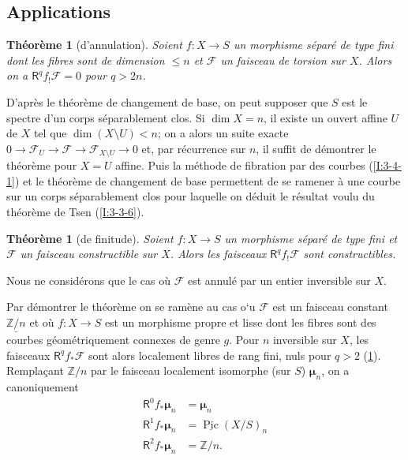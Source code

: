 \documentclass{book}
\DeclareMathOperator{\pic}{Pic}
\newcommand{\cF}{\mathcal{F}}
\newcommand{\dmu}{{\bm\mu}}%
\newcommand{\dZ}{\mathbb{Z}}
\newcommand{\const}[1]{\underline{#1}}
\newcommand{\R}{\mathsf{R}}
\newtheorem{theorem}[subsubsection]{Théorème}
\begin{document}
\subsection{Applications}\label{I:4-6}





\begin{theorem}[d'annulation]\label{I:4-6-1}
Soient $f:X\to S$ un morphisme séparé de type fini dont les fibres sont de 
dimension $\leqslant n$ et $\cF$ un faisceau de torsion sur $X$. Alors on a 
$\R^q f_! \cF = 0$ pour $q>2 n$. 
\end{theorem}

D'après le théorème de changement de base, on peut supposer que $S$ est 
le spectre d'un corps séparablement clos. Si $\dim X = n$, il existe un 
ouvert affine $U$ de $X$ tel que $\dim(X\setminus U) < n$; on a alors un suite 
exacte $0\to \cF_U \to \cF \to \cF_{X\setminus U} \to 0$ et, par récurrence sur $n$, 
il suffit de démontrer le théorème pour $X=U$ affine. Puis la méthode de 
fibration par des courbes (\ref{I:3-4-1}) et le théorème de changement de 
base permettent de se ramener à une courbe sur un corps séparablement clos 
pour laquelle on déduit le résultat voulu du théorème de Tsen 
(\ref{I:3-3-6}). 





\begin{theorem}[de finitude]\label{I:4-6-2}
Soient $f:X\to S$ un morphisme séparé de type fini et $\cF$ un faisceau 
constructible sur $X$. Alors les faisceaux $\R^q f_! \cF$ sont constructibles. 
\end{theorem}

Nous ne considérons que le cas où $\cF$ est annulé par un entier inversible 
sur $X$. 

Par démontrer le théorème on se ramène au cas o`u $\cF$ est un faisceau 
constant $\const{\dZ/n}$ et où $f:X\to S$ est un morphisme propre et lisse 
dont les fibres sont des courbes géométriquement connexes de genre $g$. 
Pour $n$ inversible sur $X$, les faisceaux $\R^q f_* \cF$ sont alors localement 
libres de rang fini, nuls pour $q>2$ (\ref{I:4-6-1}). Remplaçant $\dZ/n$ par le 
faisceau localement isomorphe (sur $S$) $\dmu_n$, on a canoniquement 
\begin{equation}\label{I:eq:4}
\begin{aligned}
  \R^0 f_* \dmu_n &= \dmu_n \\
  \R^1 f_* \dmu_n &= \const\pic(X/S)_n \\
  \R^2 f_* \dmu_n &= \dZ/n \text{.}
\end{aligned}
\end{equation}
\end{document}
